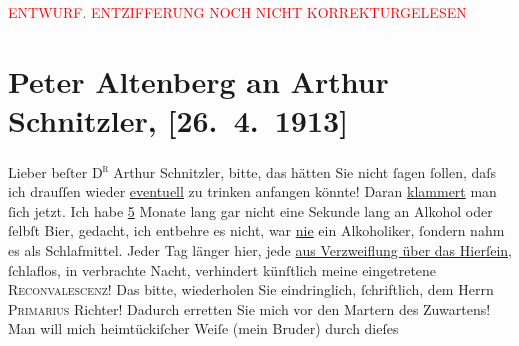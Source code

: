 
\begin{center}
            \textcolor{red}{ENTWURF. ENTZIFFERUNG NOCH NICHT KORREKTURGELESEN}
                      \end{center}
            
               \section[Peter Altenberg an Arthur Schnitzler, {[}26. 4. 1913{]}]{ Peter Altenberg an Arthur Schnitzler, {[}26. 4. 1913{]}}\nopagebreak{}\rehead{ }\begin{ledgroupsized}[t]{13cm}\normalsize\beginnumbering{} \toendnotes[C]{\smallbreak\pagebreak[2]} 
\toendnotes[C]{\smallbreak}\pstart{}{\pb}Lieber beſter \textsc{D\textsuperscript{r}} Arthur Schnitzler,\pend\pstart
           bitte, das hätten Sie nicht ſagen ſollen, daſs ich drauſſen wieder \uline{eventuell} zu trinken anfangen könnte! Daran \uline{klammert} man ſich jetzt. Ich habe \uline{5} Monate lang gar
                    nicht eine Sekunde lang an Alkohol oder ſelbſt Bier, gedacht, ich entbehre es
                    nicht, war \uline{nie} ein Alkoholiker, ſondern nahm es
                    als Schlafmittel.\pend
           \pstart
           Jeder Tag länger hier, jede \uline{aus Verzweiflung über das
                        Hierſein}, ſchlaflos, in 
                    verbrachte Nacht, verhindert künſtlich meine eingetretene {\pb}\textsc{Reconvalescenz}! Das bitte, wiederholen Sie
                    eindringlich, ſchriftlich, dem Herrn \textsc{Primarius}{ }Richter! Dadurch erretten Sie mich vor den
                    Martern des Zuwartens! Man will mich heimtückiſcher Weiſe (mein Bruder) durch dieſes

\end{ledgroupsized}
